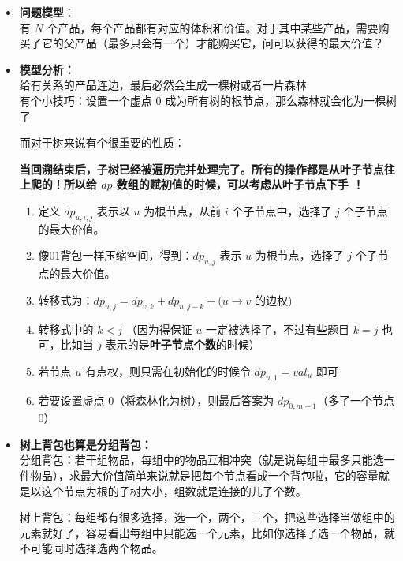 \documentclass[E:/GsjzTle/main/main.tex]{subfiles}
\begin{document}
\begin{itemize}
\item
  \textbf{问题模型}：\\
  有 \(N\)
  个产品，每个产品都有对应的体积和价值。对于其中某些产品，需要购买了它的父产品（最多只会有一个）才能购买它，问可以获得的最大价值？
\item
  \textbf{模型分析：}\\
  给有关系的产品连边，最后必然会生成一棵树或者一片森林\\
  有个小技巧：设置一个虚点 \(0\)
  成为所有树的根节点，那么森林就会化为一棵树了

  而对于树来说有个很重要的性质：

  \textbf{当回溯结束后，子树已经被遍历完并处理完了。所有的操作都是从叶子节点往上爬的！所以给
  \(dp\) 数组的赋初值的时候，可以考虑从叶子节点下手 ！}

  \begin{enumerate}
  \def\labelenumi{\arabic{enumi}.}
  \item
    定义 \(dp_{u,i,j}\) 表示以 \(u\) 为根节点，从前 \(i\)
    个子节点中，选择了 \(j\) 个子节点的最大价值。
  \item
    像\(01\)背包一样压缩空间，得到：\(dp_{u,j}\) 表示 \(u\)
    为根节点，选择了 \(j\) 个子节点的最大价值。
  \item
    转移式为：\(dp_{u,j} = dp_{v,k} + dp_{u,j-k} + (u\rightarrow v\)
    的边权\()\)
  \item
    转移式中的 \(k < j\) （因为得保证 \(u\) 一定被选择了，不过有些题目
    \(k=j\) 也可，比如当 \(j\) 表示的是\textbf{叶子节点个数}的时候）
  \item
    若节点 \(u\) 有点权，则只需在初始化的时候令 \(dp_{u,1} = val_u\)
    即可
  \item
    若要设置虚点 \(0\)（将森林化为树），则最后答案为
    \(dp_{0,m+1}\)（多了一个节点 \(0\)）
  \end{enumerate}
\item
  \textbf{树上背包也算是分组背包：}\\
  分组背包：若干组物品，每组中的物品互相冲突（就是说每组中最多只能选一件物品），求最大价值简单来说就是把每个节点看成一个背包啦，它的容量就是以这个节点为根的子树大小，组数就是连接的儿子个数。

  树上背包：每组都有很多选择，选一个，两个，三个，把这些选择当做组中的元素就好了，容易看出每组中只能选一个元素，比如你选择了选一个物品，就不可能同时选择选两个物品。
\end{itemize}
\end{document}
